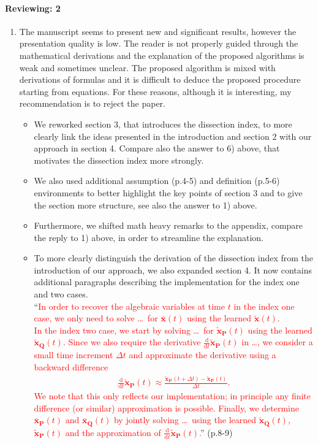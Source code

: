 \documentclass[a4paper, 10pt,
    ]{article}
\newcommand{\mb}[1]{\mathbf{#1}}
\newcommand{\mbt}[1]{\tilde{\mathbf{#1}}}
\newcommand{\mbb}[1]{\bar{\mathbf{#1}}}
\newcommand{\ddt}{\frac{\mathrm{d}}{\mathrm{d}t}}
\begin{document}
    \paragraph{Reviewing: 2}
    \begin{enumerate}
        \item \textcolor{TUDa-0c}{The manuscript seems to present new and significant results, however the presentation quality is low. The reader is not properly guided through the mathematical derivations and the explanation of the proposed algorithms is weak and sometimes unclear. The proposed algorithm is mixed with derivations of formulas and it is difficult to deduce the proposed procedure starting from equations. For these reasons, although it is interesting, my recommendation is to reject the paper.}
        \begin{itemize}
            \item We reworked section 3, that introduces the dissection index, to more clearly link the ideas presented in the introduction and section 2 with our approach in section 4. Compare also the answer to 6) above, that motivates the dissection index more strongly.

            \item We also used additional assumption (p.4-5) and definition (p.5-6) environments to better highlight the key points of section 3 and to give the section more structure, see also the answer to 1) above.

            \item Furthermore, we shifted math heavy remarks to the appendix, compare the reply to 1) above, in order to streamline the explanation.

            \item To more clearly distinguish the derivation of the dissection index from the introduction of our approach, we also expanded section 4. It now contains additional paragraphs describing the implementation for the index one and two cases.\\
            ``\textcolor{red}{In order to recover the algebraic variables at time $t$ in the index one case, we only need to solve \dots\ for $\mbb{x}(t)$ using the learned $\mbt{x}(t)$.}\\
            \textcolor{red}{In the index two case, we start by solving \dots\ for $\mbt{x}_\mb{P}(t)$ using the learned $\mbt{x}_\mb{Q}(t)$. Since we also require the derivative $\ddt \mbt{x}_\mb{P}(t)$ in \dots, we consider a small time increment $\Delta t$ and approximate the derivative using a backward difference
            \begin{align*}
                \ddt \mbt{x}_\mb{P}(t) \approx \frac{\mbt{x}_\mb{P}(t + \Delta t) - \mbt{x}_\mb{P}(t)}{\Delta t}.
            \end{align*}
            We note that this only reflects our implementation; in principle any finite difference (or similar) approximation is possible. Finally, we determine $\mbb{x}_\mb{P}(t)$ and $\mbb{x}_\mb{Q}(t)$ by jointly solving \dots\ using the learned $\mbt{x}_\mb{Q}(t)$, $\mbt{x}_\mb{P}(t)$ and the approximation of $\ddt \mbt{x}_\mb{P}(t)$.}'' (p.8-9)


\end{itemize}
\end{enumerate}
\end{document}
